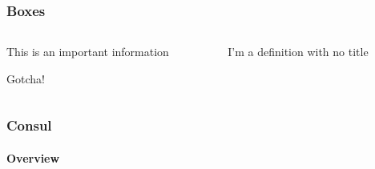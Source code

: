 


\begin{frame} %
	\frametitle{Boxes}
	\begin{columns}[t]
		\begin{column}{0.45\textwidth}
			\begin{block}
				This is an important information
			\end{block}
			\begin{alertblock}[Argh]
				Gotcha!
			\end{alertblock}
		\end{column}
		\begin{column}{0.45\textwidth}
			\begin{definition}
				I'm a definition with no title
			\end{definition}
		\end{column}
	\end{columns}
\end{frame}

\begin{frame}
	\frametitle{Consul}
	\framesubtitle{Overview}
\end{frame}

